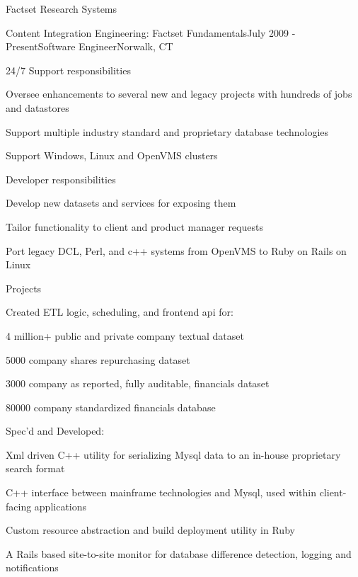 \documentclass{resume} %
\begin{document}
\begin{rSection}{Factset Research Systems}
\begin{rSubsection}{Content Integration Engineering: Factset Fundamentals}{July 2009 - Present}{Software Engineer}{Norwalk, CT}
\setlength{\itemindent}{1em}
\item 24/7 Support responsibilities 
\setlength{\itemindent}{2em}
\item Oversee enhancements to several new and legacy projects with hundreds of jobs and datastores
\item Support multiple industry standard and proprietary database technologies
\item Support Windows, Linux and OpenVMS clusters
\setlength{\itemindent}{1em}
\item Developer responsibilities 
\setlength{\itemindent}{2em}
\item Develop new datasets and services for exposing them 
\item Tailor functionality to client and product manager requests
\item Port legacy DCL, Perl, and c++ systems from OpenVMS to Ruby on Rails on Linux
\setlength{\itemindent}{1em}
\item Projects 
\setlength{\itemindent}{2em}
\item Created ETL logic, scheduling, and frontend api for:
\setlength{\itemindent}{3em}
\item 4 million+ public and private company textual dataset
\item 5000 company shares repurchasing dataset
\item 3000 company as reported, fully auditable, financials dataset
\item 80000 company standardized financials database
\setlength{\itemindent}{2em}
\item Spec'd and Developed:
\setlength{\itemindent}{3em}
\item Xml driven C++ utility for serializing Mysql data to an in-house proprietary search format
\item C++ interface between mainframe technologies and Mysql, used within client-facing applications
\item Custom resource abstraction and build deployment utility in Ruby
\item A Rails based site-to-site monitor for database difference detection, logging and notifications
\end{rSubsection}

\end{rSection}

\end{document}
